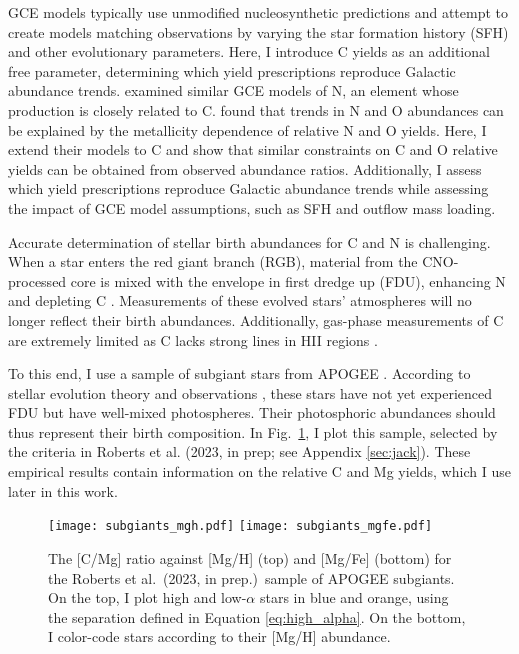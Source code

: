 \documentclass[12pt,oneside]{report}
\newcommand{\citetjack}{Roberts et al.~(2023, in prep.)}
\begin{document}
GCE models typically use unmodified nucleosynthetic predictions and attempt to create models matching observations by varying the star formation history (SFH) and other evolutionary parameters. Here, I introduce C yields as an additional free parameter, determining which yield prescriptions reproduce Galactic abundance trends.
\cite{james+23} examined similar GCE models of N, an element whose production is closely related to C. \cite{james+23} found that trends in N and O abundances can be explained by the metallicity dependence of relative N and O yields. Here, I extend their models to C and show that similar constraints on C and O relative yields can be obtained from observed abundance ratios. Additionally, I assess which yield prescriptions reproduce Galactic abundance trends while assessing the impact of GCE model assumptions, such as SFH and outflow mass loading.

Accurate determination of stellar birth abundances for C and N is challenging. When a star enters the red giant branch (RGB), material from the CNO-processed core is mixed with the envelope in first dredge up (FDU), enhancing N and depleting C \citep{iben67, vincenzo+21,KL14}. Measurements of these evolved stars'  atmospheres will no longer reflect their birth abundances.  Additionally, gas-phase measurements of C are extremely limited as C lacks strong lines in HII regions \citep{skillman+20}.

To this end, I use a sample of subgiant stars from APOGEE \citep{apogee17}. According to stellar evolution theory and observations \citep{gilroy89, korn+07, lind+08, souto+18, souto19}, these stars have not yet experienced FDU but have well-mixed photospheres. Their photosphoric abundances should thus represent their birth composition.  In Fig.~\ref{fig:subgiants}, I plot this sample, selected by the criteria in Roberts et al. (2023, in prep; see Appendix \ref{sec:jack}). These empirical results contain information on the relative C and Mg yields, which I use later in this work.

\begin{figure}[htp]
    \texttt{[image: subgiants\_mgh.pdf]}
    \texttt{[image: subgiants\_mgfe.pdf]}
    \caption[APOGEE Subgiants]{The [C/Mg] ratio against [Mg/H] (top) and [Mg/Fe] (bottom) for the \citetjack~sample of APOGEE subgiants. On the top, I plot high and low-$\alpha$ stars in blue and orange, using the separation defined in Equation \ref{eq:high_alpha}. On the bottom, I color-code stars according to their [Mg/H] abundance.}
    \label{fig:subgiants}
\end{figure}
\end{document}
